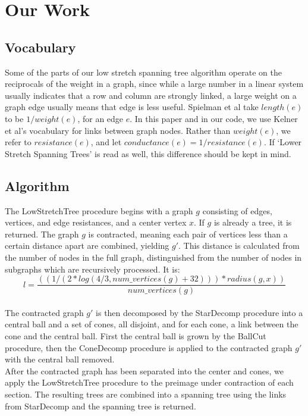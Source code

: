 \documentclass{article}
\begin{document}
\section*{Our Work}
\subsection*{Vocabulary}
Some of the parts of our low stretch spanning tree algorithm operate on the reciprocals of the weight in a graph, since while a large number in a linear system usually indicates that a row and column are strongly linked, a large weight on a graph edge usually means that edge is less useful.  Spielman et al take $length(e)$ to be $1/weight(e)$, for an edge $e$.  In this paper and in our code, we use Kelner et al's vocabulary for links between graph nodes.  Rather than $weight(e)$, we refer to $resistance(e)$, and let $conductance(e)=1/resistance(e)$.  If `Lower Stretch Spanning Trees' is read as well, this difference should be kept in mind.  

\subsection*{Algorithm}
The LowStretchTree procedure begins with a graph $g$ consisting of edges, vertices, and edge resistances, and a center vertex $x$.
If $g$ is already a tree, it is returned.
The graph $g$ is contracted, meaning each pair of vertices less than a certain distance apart are combined, yielding $g'$. This distance is calculated from the number of nodes in the full graph, distinguished from the number of nodes in subgraphs which are recursively processed.  It is: 
$$l=\frac{((1/(2*log(4/3,num\_vertices(g) + 32)))*radius(g, x))}{num\_vertices(g)}$$\\
The contracted graph $g'$ is then decomposed by the StarDecomp procedure into a central ball and a set of cones, all disjoint, and for each cone, a link between the cone and the central ball.   First the central ball is grown by the BallCut procedure, then the ConeDecomp procedure is applied to the contracted graph $g'$ with the central ball removed.\\
After the contracted graph has been separated into the center and cones, we apply the LowStretchTree procedure to the preimage under contraction of each section.  The resulting trees are combined into a spanning tree using the links from StarDecomp and the spanning tree is returned.
\end{document}
